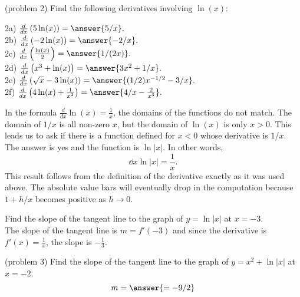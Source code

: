 \documentclass{ximera}
\begin{document}
\begin{problem}(problem 2)
Find the following derivatives involving $\ln(x)$:

2a) $\frac{d}{dx} \left(5\ln(x)\right) = \answer{5/x}.$\\
2b) $\frac{d}{dx} \left(-2\ln(x)\right) = \answer{-2/x}.$\\
2c) $\frac{d}{dx} \left(\frac{\ln(x)}{2}\right) = \answer{1/(2x)}.$\\
2d) $\frac{d}{dx} \left(x^3 + \ln(x)\right) = \answer{3x^2 + 1/x}.$\\
2e) $\frac{d}{dx} \left(\sqrt x - 3\ln(x)\right) = \answer{(1/2)x^{-1/2} - 3/x}.$\\
2f) $\frac{d}{dx} \left(4\ln(x) + \frac{1}{x^2}\right) = \answer{4/x -\frac{2}{x^3}}.$


\end{problem}





In the formula $\tfrac{d}{dx} \ln(x) = \tfrac{1}{x}$, the domains of the functions do not match.  
The domain of $1/x$ is all non-zero $x$, but the domain of 
$\ln(x)$  is only $x >0$.  This leads us to ask if there is a function defined for $x<0$ whose derivative is $1/x$. 
The answer is yes and the function is 
$\ln|x|$. In other words,
\[
\dd{x} \ln|x| = \frac{1}{x}.
\]
This result follows from the definition of the derivative exactly as it was used above.  
The absolute value bars will eventually drop in the computation because $1+h/x$ becomes positive as $h \to 0$.
 
\begin{example}[example 3]
Find the slope of the tangent line to the graph of $y = \ln|x|$ at $x = -3$.\\
The slope of the tangent line is $m = f'(-3)$ and since the derivative is $f'(x) = \frac{1}{x}$,
the slope is $-\frac13$.
\end{example}
 
\begin{problem}(problem 3)
Find the slope of the tangent line to the graph of $y= x^2 + \ln|x|$ at $x = -2$.
\[
m = \answer{ = -9/2}
\]
\end{problem}
 
  
\begin{foldable}
\end{foldable}
\end{document}
